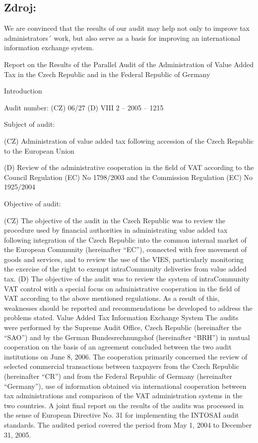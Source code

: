 \documentclass[10pt]{article}
\begin{document}
\subsection*{Zdroj:}

We are convinced that the results of our audit may help not only to improve tax administrators´ work, but also serve as a basis for improving an international information exchange system.


Report on the Results of the Parallel Audit of the Administration of Value Added Tax in the Czech Republic and in the Federal Republic of Germany



Introduction



Audit number: (CZ) 06/27 (D) VIII 2 – 2005 – 1215



Subject of audit:



(CZ) Administration of value added tax following accession of the Czech Republic to the European Union



(D) Review of the administrative cooperation in the field of VAT according to the Council Regulation (EC) No 1798/2003 and the Commission Regulation (EC) No 1925/2004



Objective of audit:

(CZ) The objective of the audit in the Czech Republic was to review the procedure used by financial authorities in administrating value added tax following integration of the Czech Republic into the common internal market of the European Community (hereinafter “EC”), connected with free movement of goods and services, and to review the use of the VIES, particularly monitoring the exercise of the right to exempt intraCommunity deliveries from value added tax.
(D) The objective of the audit was to review the system of intraCommunity VAT control with a special focus on administrative cooperation in the field of VAT according to the above mentioned regulations.
As a result of this, weaknesses should be reported and recommendations be developed to address the problems stated.
Value Added Tax Information Exchange System The audits were performed by the Supreme Audit Office, Czech Republic (hereinafter the “SAO”) and by the German Bundesrechnungshof (hereinafter “BRH”) in mutual cooperation on the basis of an agreement concluded between the two audit institutions on June 8, 2006.
The cooperation primarily concerned the review of selected commercial transactions between taxpayers from the Czech Republic (hereinafter “CR”) and from the Federal Republic of Germany (hereinafter “Germany”), use of information obtained via international cooperation between tax administrations and comparison of the VAT administration systems in the two countries.
A joint final report on the results of the audits was processed in the sense of European Directive No. 31 for implementing the INTOSAI audit standards.
The audited period covered the period from May 1, 2004 to December 31, 2005.
\end{document}
